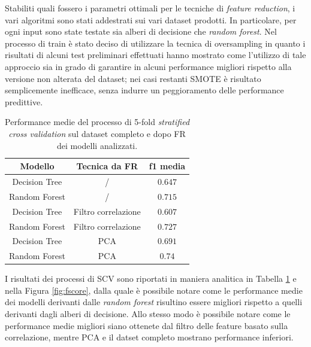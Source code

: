 Stabiliti quali fossero i parametri ottimali per le tecniche di \textit{feature reduction}, i vari algoritmi sono stati addestrati sui vari dataset prodotti. In particolare, per ogni input sono state testate sia alberi di decisione che \textit{random forest}. Nel processo di train è stato deciso di utilizzare la tecnica di oversampling in quanto i risultati di alcuni test preliminari effettuati hanno mostrato come l'utilizzo di tale approccio sia in grado di garantire in alcuni performance migliori rispetto alla versione non alterata del dataset; nei casi restanti SMOTE è risultato semplicemente inefficace, senza indurre un peggioramento delle performance predittive.
\begin{table}
	\centering
	\caption{Performance medie del processo di 5-fold \textit{stratified cross validation} sul dataset completo e dopo FR dei modelli analizzati.}
	\label{tab:f1score}
	\begin{tabular}{|c|c|c|}
		\toprule
		Modello & Tecnica da FR & f1 media \\ 
		\midrule 
		Decision Tree & / & $0.647$ \\  
		Random Forest & / & $0.715$ \\ 
		Decision Tree & Filtro correlazione & $0.607$ \\ 
		Random Forest & Filtro correlazione & $0.727$ \\ 
		Decision Tree & PCA & $0.691$ \\ 
		Random Forest & PCA & $0.74$ \\ 
		\bottomrule
	\end{tabular}
\end{table}
I risultati dei processi di SCV sono riportati in maniera analitica in Tabella \ref{tab:f1score} e nella Figura \ref{fig:fscore}, dalla quale è possibile notare come le performance medie dei modelli derivanti dalle \textit{random forest} risultino essere migliori rispetto a quelli derivanti dagli alberi di decisione. Allo stesso modo è possibile notare come le performance medie migliori siano ottenete dal filtro delle feature basato sulla correlazione, mentre PCA e il datset completo mostrano performance inferiori. 

